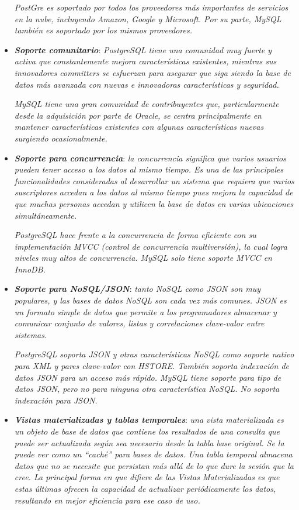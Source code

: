\documentclass[11pt,oneside]{book}
\begin{document}
\begin{itemize}
\textit{PostGre es soportado por todos los proveedores más importantes de servicios en la nube, incluyendo Amazon, Google y Microsoft. Por su parte, MySQL también es soportado por los mismos proveedores.}

\item \textit{\textbf{Soporte comunitario}}: \textit{PostgreSQL tiene una comunidad muy fuerte y activa que constantemente mejora características existentes, mientras sus innovadores committers se esfuerzan para asegurar que siga siendo la base de datos más avanzada con nuevas e innovadoras características y seguridad.}
	
\textit{MySQL tiene una gran comunidad de contribuyentes que, particularmente desde la adquisición por parte de Oracle, se centra principalmente en mantener características existentes con algunas características nuevas surgiendo ocasionalmente.}

\item \textit{\textbf{Soporte para concurrencia}}: \textit{la concurrencia significa que varios usuarios pueden tener acceso a los datos al mismo tiempo. Es una de las principales funcionalidades consideradas al desarrollar un sistema que requiera que varios suscriptores accedan a los datos al mismo tiempo pues mejora la capacidad de que muchas personas accedan y utilicen la base de datos en varias ubicaciones simultáneamente.}

\textit{PostgreSQL hace frente a la concurrencia de forma eficiente con su implementación MVCC (control de concurrencia multiversión), la cual logra niveles muy altos de concurrencia. MySQL solo tiene soporte MVCC en InnoDB.}

\item \textit{\textbf{Soporte para NoSQL/JSON}}: \textit{tanto NoSQL como JSON son muy populares, y las bases de datos NoSQL son cada vez más comunes. JSON es un formato simple de datos que permite a los programadores almacenar y comunicar conjunto de valores, listas y correlaciones clave-valor entre sistemas.}

\textit{PostgreSQL soporta JSON y otras características NoSQL como soporte nativo para XML y pares clave-valor con HSTORE. También soporta indexación de datos JSON para un acceso más rápido. MySQL tiene soporte para tipo de datos JSON, pero no para ninguna otra característica NoSQL. No soporta indexación para JSON.}

\item \textit{\textbf{Vistas materializadas y tablas temporales}}: \textit{una vista materializada es un objeto de base de datos que contiene los resultados de una consulta que puede ser actualizada según sea necesario desde la tabla base original. Se la puede ver como un ``caché'' para bases de datos. Una tabla temporal almacena datos que no se necesite que persistan más allá de lo que dure la sesión que la cree. La principal forma en que difiere de las Vistas Materializadas es que estas últimas ofrecen la capacidad de actualizar periódicamente los datos, resultando en mejor eficiencia para ese caso de uso.}


\end{itemize}
\end{document}
